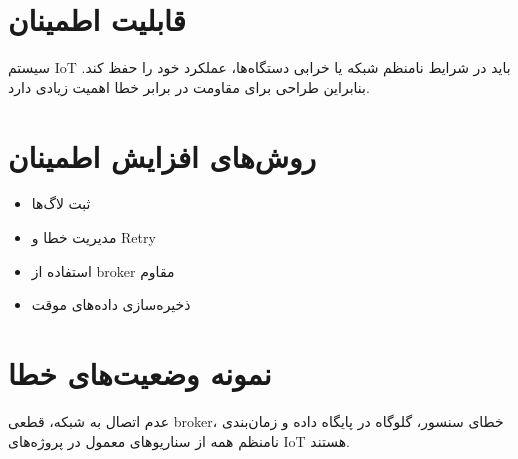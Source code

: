 \section{قابلیت اطمینان}

سیستم IoT باید در شرایط نامنظم شبکه یا خرابی دستگاه‌ها، عملکرد خود را حفظ کند. بنابراین طراحی برای مقاومت در برابر خطا اهمیت زیادی دارد.

\section{روش‌های افزایش اطمینان}

\begin{itemize}
    \item ثبت لاگ‌ها
    \item مدیریت خطا و Retry
    \item استفاده از broker مقاوم
    \item ذخیره‌سازی داده‌های موقت
\end{itemize}

\section{نمونه وضعیت‌های خطا}

عدم اتصال به شبکه، قطعی broker، خطای سنسور، گلوگاه در پایگاه داده و زمان‌بندی نامنظم همه از سناریوهای معمول در پروژه‌های IoT هستند.
